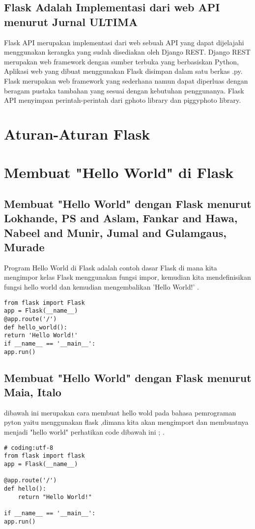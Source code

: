 \documentclass[12pt]{article}
\begin{document}
\subsection{Flask Adalah Implementasi dari web API menurut Jurnal ULTIMA}
Flask API merupakan implementasi dari web sebuah API yang dapat dijelajahi menggunakan kerangka yang sudah disediakan oleh Django REST. Django REST merupakan web framework dengan sumber terbuka yang berbasiskan Python, Aplikasi web yang dibuat menggunakan Flask disimpan dalam satu berkas .py. Flask merupakan web framework yang sederhana namun dapat diperluas dengan beragam pustaka tambahan yang sesuai dengan kebutuhan penggunanya. Flask API menyimpan perintah-perintah dari gphoto library dan piggyphoto library\cite{computingaplikasi}. 

\section{Aturan-Aturan Flask}

 
 
\section{Membuat "Hello World" di Flask}
\subsection{Membuat "Hello World" dengan Flask menurut Lokhande, PS and Aslam, Fankar and Hawa, Nabeel and Munir, Jumal and Gulamgaus, Murade}
Program Hello World di Flask adalah contoh dasar Flask di mana kita mengimpor kelas Flask menggunakan fungsi impor, kemudian kita mendefinisikan fungsi hello world dan kemudian mengembalikan 'Hello World!' \cite{lokhande2015efficient}.
\begin{verbatim}
from flask import Flask
app = Flask(__name__)
@app.route('/')
def hello_world():
return 'Hello World!'
if __name__ == '__main__':
app.run()
\end{verbatim}

\subsection{Membuat "Hello World" dengan Flask menurut Maia, Italo}
dibawah ini merupakan cara membuat hello wold pada bahasa pemrograman pyton yaitu menggunakan flask ,dimana kita akan mengimport dan membuatnya menjadi "hello world" perhatikan code dibawah ini ;
\cite{maia2015building}.
\begin{verbatim}
# coding:utf-8
from flask import flask 
app = Flask(__name__)

@app.route('/')
def hello():
	return "Hello World!"
	
if __name__ == '__main__':
app.run()
\end{verbatim}
\end{document}
